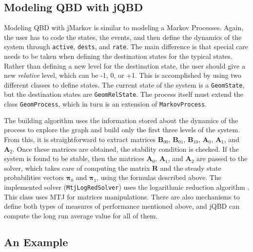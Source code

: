 \documentclass[11pt,letterpaper]{article}
\newcommand{\bA}{{\mathbf A}}
\newcommand{\bB}{{\mathbf B}}
\newcommand{\bR}{{\mathbf R}}
\newcommand{\bpi}{{\boldsymbol{\pi}}}
\newcommand{\Active}{\texttt{active}\xspace}
\newcommand{\Rate}{\texttt{rate}\xspace}
\newcommand{\Dests}{\texttt{dests}\xspace}
\newcommand\MarkovProcess{\texttt{Markov\-Pro\-cess}\xspace}
\newcommand\GeomProcess{\texttt{Geom\-Pro\-cess}\xspace}
\begin{document}
\subsection{Modeling QBD with jQBD}\label{sec:QBDmodule}

Modeling QBD with jMarkov is similar to modeling a Markov Processes. Again, the user has to code the states, the events, and then define the dynamics of the system through \Active, \Dests, and \Rate. The main difference is that special care needs to be taken when defining the destination states for the typical states. Rather than defining a new level for the destination state, the user should give a new \textit{relative} level, which can be -1, 0, or +1. This is accomplished by using two different classes to define states. The current state of the system is a \texttt{GeomState}, but the destination states are \texttt{GeomRelState}. The process itself must extend the class \GeomProcess, which in turn is an extension of \MarkovProcess.

The building algorithm uses the information stored about the dynamics of the process to explore the graph and build only the first three levels of the system. From this, it is straightforward to extract matrices $\bB_{00}$, $\bB_{01}$, $\bB_{10}$,  $\bA_0$, $\bA_1$, and $\bA_2$. Once these matrices are obtained,  the stability condition is checked. If the system is found to be stable, then the matrices $\bA_0$, $\bA_1$, and $\bA_2$ are passed to the solver, which takes care of computing the matrix $\bR$ and the steady state probabilities vectors $\bpi_0$ and $\bpi_1$, using the formulas described above. The implemented solver (\texttt{MtjLogRedSolver}) uses the logarithmic reduction algorithm \cite{lato.rama99}. This class uses MTJ for matrices manipulations.
There are also mechanisms to define both types of measures of performance mentioned above, and jQBD can compute the long run average value for all of them.


\subsection{An Example} \label{sec:Usage}
\end{document}
